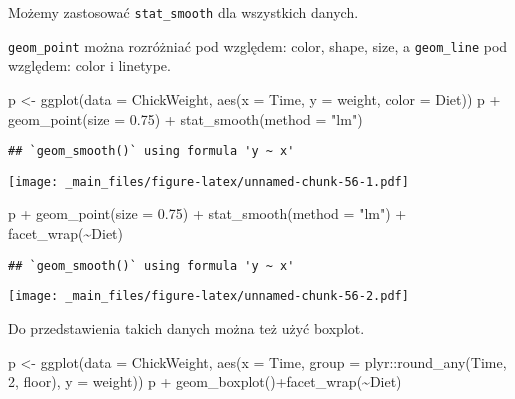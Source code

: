 \documentclass[
]{book}
\newenvironment{Shaded}{\begin{snugshade}}{\end{snugshade}}
\newcommand{\AttributeTok}[1]{\textcolor[rgb]{0.77,0.63,0.00}{#1}}
\newcommand{\DecValTok}[1]{\textcolor[rgb]{0.00,0.00,0.81}{#1}}
\newcommand{\FloatTok}[1]{\textcolor[rgb]{0.00,0.00,0.81}{#1}}
\newcommand{\FunctionTok}[1]{\textcolor[rgb]{0.00,0.00,0.00}{#1}}
\newcommand{\NormalTok}[1]{#1}
\newcommand{\OtherTok}[1]{\textcolor[rgb]{0.56,0.35,0.01}{#1}}
\newcommand{\SpecialCharTok}[1]{\textcolor[rgb]{0.00,0.00,0.00}{#1}}
\newcommand{\StringTok}[1]{\textcolor[rgb]{0.31,0.60,0.02}{#1}}
\begin{document}
Możemy zastosować \texttt{stat\_smooth} dla wszystkich danych.

\texttt{geom\_point} można rozróżniać pod względem: color, shape, size, a \texttt{geom\_line} pod względem: color i linetype.

\begin{Shaded}
\begin{Highlighting}[]
\NormalTok{p }\OtherTok{\textless{}{-}} \FunctionTok{ggplot}\NormalTok{(}\AttributeTok{data =}\NormalTok{ ChickWeight, }\FunctionTok{aes}\NormalTok{(}\AttributeTok{x =}\NormalTok{ Time, }\AttributeTok{y =}\NormalTok{ weight, }\AttributeTok{color =}\NormalTok{ Diet))}
\NormalTok{p }\SpecialCharTok{+} \FunctionTok{geom\_point}\NormalTok{(}\AttributeTok{size =} \FloatTok{0.75}\NormalTok{) }\SpecialCharTok{+} \FunctionTok{stat\_smooth}\NormalTok{(}\AttributeTok{method =} \StringTok{"lm"}\NormalTok{)}
\end{Highlighting}
\end{Shaded}

\begin{verbatim}
## `geom_smooth()` using formula 'y ~ x'
\end{verbatim}

\texttt{[image: \_main\_files/figure-latex/unnamed-chunk-56-1.pdf]}

\begin{Shaded}
\begin{Highlighting}[]
\NormalTok{p }\SpecialCharTok{+} \FunctionTok{geom\_point}\NormalTok{(}\AttributeTok{size =} \FloatTok{0.75}\NormalTok{) }\SpecialCharTok{+} \FunctionTok{stat\_smooth}\NormalTok{(}\AttributeTok{method =} \StringTok{"lm"}\NormalTok{) }\SpecialCharTok{+} \FunctionTok{facet\_wrap}\NormalTok{(}\SpecialCharTok{\textasciitilde{}}\NormalTok{Diet)}
\end{Highlighting}
\end{Shaded}

\begin{verbatim}
## `geom_smooth()` using formula 'y ~ x'
\end{verbatim}

\texttt{[image: \_main\_files/figure-latex/unnamed-chunk-56-2.pdf]}

Do przedstawienia takich danych można też użyć boxplot.

\begin{Shaded}
\begin{Highlighting}[]
\NormalTok{p }\OtherTok{\textless{}{-}} \FunctionTok{ggplot}\NormalTok{(}\AttributeTok{data =}\NormalTok{ ChickWeight, }\FunctionTok{aes}\NormalTok{(}\AttributeTok{x =}\NormalTok{ Time, }\AttributeTok{group =}\NormalTok{ plyr}\SpecialCharTok{::}\FunctionTok{round\_any}\NormalTok{(Time, }\DecValTok{2}\NormalTok{, floor), }\AttributeTok{y =}\NormalTok{ weight))}
\NormalTok{p }\SpecialCharTok{+} \FunctionTok{geom\_boxplot}\NormalTok{()}\SpecialCharTok{+}\FunctionTok{facet\_wrap}\NormalTok{(}\SpecialCharTok{\textasciitilde{}}\NormalTok{Diet)}
\end{Highlighting}
\end{Shaded}
\end{document}
